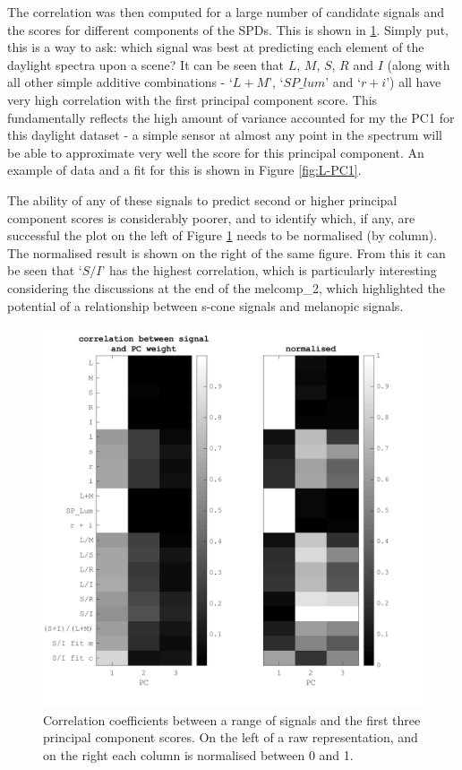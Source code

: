 
The correlation was then computed for a large number of candidate signals and the scores for different components of the \glspl{SPD}. This is shown in \ref{fig:19}. Simply put, this is a way to ask: which signal was best at predicting each element of the daylight spectra upon a scene? It can be seen that $L$, $M$, $S$, $R$ and $I$ (along with all other simple additive combinations - `$L+M$', `$SP\_lum$' and `$r+i$') all have very high correlation with the first principal component score. This fundamentally reflects the high amount of variance accounted for my the \gls{PC1} for this daylight dataset - a simple sensor at almost any point in the spectrum will be able to approximate very well the score for this principal component. An example of data and a fit for this is shown in Figure \ref{fig:L-PC1}.

The ability of any of these signals to predict second or higher principal component scores is considerably poorer, and to identify which, if any, are successful the plot on the left of Figure \ref{fig:19} needs to be normalised (by column). The normalised result is shown on the right of the same figure. From this it can be seen that `$S/I$' has the highest correlation, which is particularly interesting considering the discussions at the end of the melcomp\_2, which highlighted the potential of a relationship between s-cone signals and melanopic signals.

\begin{figure}[htbp]
 \includegraphics[max width=\textwidth]{figs/comp/melcomp_3/19.png}
 \caption{Correlation coefficients between a range of signals and the first three principal component scores. On the left of a raw representation, and on the right each column is normalised between 0 and 1.}
 \label{fig:19}
\end{figure} 

